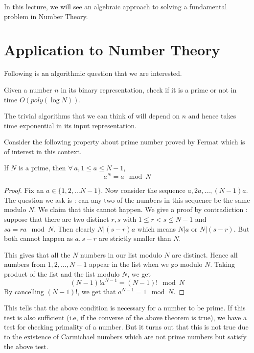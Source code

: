 In this lecture, we will see an algebraic approach to solving a fundamental
problem in Number Theory.
\section{Application to Number Theory}
Following is an algorithmic question that we are interested.
\begin{problem}
Given a number $n$ in its binary representation, check if it is a prime or not
in time $O(poly(\log N))$.
\end{problem}
\begin{note}
The trivial algorithms that we can think of will depend on $n$ and hence takes
time exponential in its input representation.
\end{note}

Consider the following property about prime number proved by Fermat which is
of interest in this context.
\begin{theorem} If $N$ is a prime, then $\forall~a, 1
	\le a \le N-1$, \[ a^N = a \mod N \]
\end{theorem}
\begin{proof}
	Fix an $a \in \{1,2,\ldots N-1\}$. Now consider the sequence $a, 2a,
	\ldots, (N-1)a$. The question we ask is : can any two of the numbers
	in this sequence be the same modulo $N$. We claim that this cannot
	happen. We give a proof by contradiction : suppose that there are two
	distinct $r,s$ with $1 \le r < s \le N-1$ and $sa = ra \mod N$. Then
	clearly $N | (s-r)a$ which means $N | a$ or $N | (s-r)$. But both
	cannot happen as $a, s-r$ are strictly smaller than $N$.

	This gives that all the $N$ numbers in our list modulo $N$ are
	distinct. Hence all numbers from $1,2,\ldots, N-1$ appear in the list
	when we go modulo $N$. Taking product of the list and the list modulo
	$N$, we get 
	\[ (N-1)! a^{N-1} = (N-1)! \mod N \]
	By cancelling $(N-1)!$, we get that $a^{N-1} = 1 \mod N$.
\end{proof}
This tells that the above condition is necessary for a number to be prime. If
this test is also sufficient (i.e, if the converse of the above theorem is
true), we have a test for checking primality of a number. But it turns out
that this is not true due to the existence of Carmichael numbers which are not
prime numbers but satisfy the above test.

